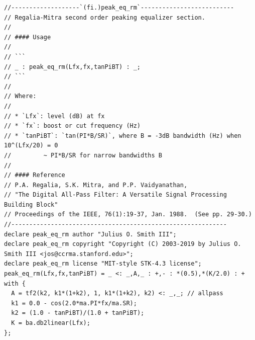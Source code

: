\documentclass{article}
\begin{document}
\begin{lstlisting}[caption=\texttt{filters.lib}]
//-------------------`(fi.)peak_eq_rm`--------------------------
// Regalia-Mitra second order peaking equalizer section.
//
// #### Usage
//
// ```
// _ : peak_eq_rm(Lfx,fx,tanPiBT) : _;
// ```
//
// Where:
//
// * `Lfx`: level (dB) at fx
// * `fx`: boost or cut frequency (Hz)
// * `tanPiBT`: `tan(PI*B/SR)`, where B = -3dB bandwidth (Hz) when 10^(Lfx/20) = 0
//         ~ PI*B/SR for narrow bandwidths B
//
// #### Reference
// P.A. Regalia, S.K. Mitra, and P.P. Vaidyanathan,
// "The Digital All-Pass Filter: A Versatile Signal Processing Building Block"
// Proceedings of the IEEE, 76(1):19-37, Jan. 1988.  (See pp. 29-30.)
//------------------------------------------------------------
declare peak_eq_rm author "Julius O. Smith III";
declare peak_eq_rm copyright "Copyright (C) 2003-2019 by Julius O. Smith III <jos@ccrma.stanford.edu>";
declare peak_eq_rm license "MIT-style STK-4.3 license";
peak_eq_rm(Lfx,fx,tanPiBT) = _ <: _,A,_ : +,- : *(0.5),*(K/2.0) : + with {
  A = tf2(k2, k1*(1+k2), 1, k1*(1+k2), k2) <: _,_; // allpass
  k1 = 0.0 - cos(2.0*ma.PI*fx/ma.SR);
  k2 = (1.0 - tanPiBT)/(1.0 + tanPiBT);
  K = ba.db2linear(Lfx);
};



\end{lstlisting}
\end{document}
